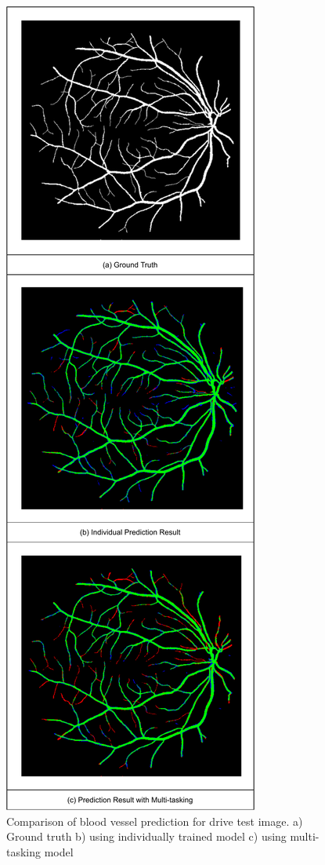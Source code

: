 \begin{figure}[!ht]
  \centering
  \includegraphics[width=0.6\linewidth]{images/Prediction_Results (1).pdf}
  \caption{Comparison of  blood vessel prediction for drive test image. a) Ground truth b) using individually trained model c) using multi-tasking model }
  \label{simultaneous_vs_individual}
\end{figure}


